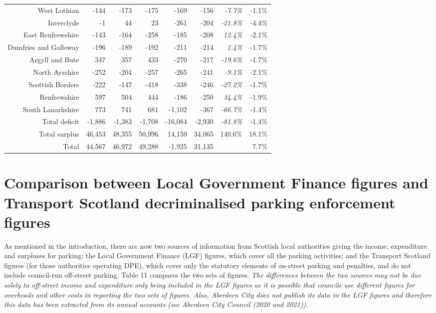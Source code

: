 \documentclass[
  12pt,
]{article}
\begin{document}
\begin{longtable}[t]{rrrrrrrr}
West Lothian & -144 & -173 & -175 & -169 & -156 & \em{ -7.7\%} & -1.1\%\\
Inverclyde & -1 & 44 & 23 & -261 & -204 & \em{-21.8\%} & -4.4\%\\
East Renfrewshire & -143 & -164 & -258 & -185 & -208 & \em{ 12.4\%} & -2.1\%\\
Dumfries and Galloway & -196 & -189 & -192 & -211 & -214 & \em{  1.4\%} & -1.7\%\\
Argyll and Bute & 347 & 357 & 433 & -270 & -217 & \em{-19.6\%} & -1.7\%\\
North Ayrshire & -252 & -204 & -257 & -265 & -241 & \em{ -9.1\%} & -2.1\%\\
Scottish Borders & -222 & -147 & -418 & -338 & -246 & \em{-27.2\%} & -1.7\%\\
Renfrewshire & 597 & 504 & 444 & -186 & -250 & \em{ 34.4\%} & -1.9\%\\
South Lanarkshire & 773 & 741 & 681 & -1,102 & -367 & \em{-66.7\%} & -1.4\%\\
\midrule
Total deficit & -1,886 & -1,383 & -1,708 & -16,084 & -2,930 & \em{-81.8\%} & -1.4\%\\
Total surplus & 46,453 & 48,355 & 50,996 & 14,159 & 34,065 & 140.6\% & 18.1\%\\
\midrule
Total & 44,567 & 46,972 & 49,288 & -1,925 & 31,135 &  & 7.7\%\\*
\end{longtable}
\endgroup{}

\newpage

\hypertarget{comparison-between-local-government-finance-figures-and-transport-scotland-decriminalised-parking-enforcement-figures}{%
\section{Comparison between Local Government Finance figures and Transport Scotland decriminalised parking enforcement figures}\label{comparison-between-local-government-finance-figures-and-transport-scotland-decriminalised-parking-enforcement-figures}}

As mentioned in the introduction, there are now two sources of information from Scottish local authorities giving the income, expenditure and surpluses for parking: the Local Government Finance (LGF) figures, which cover all the parking activities; and the Transport Scotland figures (for those authorities operating DPE), which cover only the statutory elements of on-street parking and penalties, and do not include council-run off-street parking. Table 11 compares the two sets of figures. \emph{The differences between the two sources may not be due solely to off-street income and expenditure only being included in the LGF figures as it is possible that councils use different figures for overheads and other costs in reporting the two sets of figures. Also, Aberdeen City does not publish its data in the LGF figures and therefore this data has been extracted from its annual accounts (see Aberdeen City Council (2020 and 2021)).}
\end{document}
